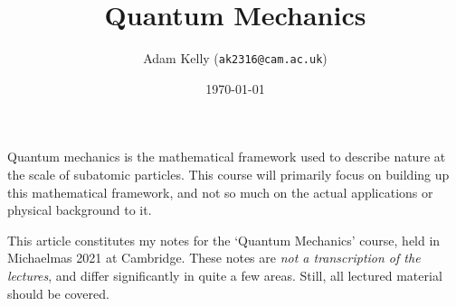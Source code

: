 \documentclass[a4paper]{scrartcl}
\title{Quantum Mechanics}
\author{Adam Kelly (\texttt{ak2316@cam.ac.uk})}
\date{\today}
\begin{document}
\maketitle


Quantum mechanics is the mathematical framework used to describe nature at the scale of subatomic particles. This course will primarily focus on building up this mathematical framework, and not so much on the actual applications or physical background to it.


This article constitutes my notes for the `Quantum Mechanics' course, held in Michaelmas 2021 at Cambridge. These notes are \emph{not a transcription of the lectures}, and differ significantly in quite a few areas. Still, all lectured material should be covered.



\tableofcontents




\end{document}
